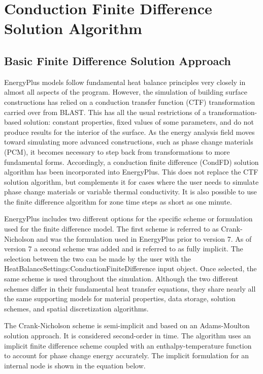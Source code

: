 \section{Conduction Finite Difference Solution Algorithm}\label{conduction-finite-difference-solution-algorithm}

\subsection{Basic Finite Difference Solution Approach}\label{basic-finite-difference-solution-approach}

EnergyPlus models follow fundamental heat balance principles very closely in
almost all aspects of the program. However, the simulation of building surface
constructions has relied on a conduction transfer function (CTF) transformation
carried over from BLAST. This has all the usual restrictions of a
transformation-based solution: constant properties, fixed values of some
parameters, and do not produce results for the interior of the surface. As the
energy analysis field moves toward simulating more advanced constructions, such
as phase change materials (PCM), it becomes necessary to step back from
transformations to more fundamental forms. Accordingly, a conduction finite
difference (CondFD) solution algorithm has been incorporated into EnergyPlus.
This does not replace the CTF solution algorithm, but complements it for cases
where the user needs to simulate phase change materials or variable thermal
conductivity. It is also possible to use the finite difference algorithm for
zone time steps as short as one minute.

EnergyPlus includes two different options for the specific scheme or formulation
used for the finite difference model. The first scheme is referred to as Crank-
Nicholson and was the formulation used in EnergyPlus prior to version 7. As of
version 7 a second scheme was added and is referred to as fully implicit. The
selection between the two can be made by the user with the
HeatBalanceSettings:ConductionFiniteDifference input object. Once selected, the
same scheme is used throughout the simulation. Although the two different schemes
differ in their fundamental heat transfer equations, they share nearly all the
same supporting models for material properties, data storage, solution schemes,
and spatial discretization algorithms.

The Crank-Nicholson scheme is semi-implicit and based on an Adams-Moulton
solution approach. It is considered second-order in time. The algorithm uses an
implicit finite difference scheme coupled with an enthalpy-temperature function
to account for phase change energy accurately. The implicit formulation for an
internal node is shown in the equation below.

